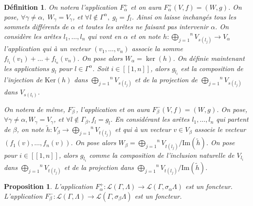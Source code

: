 \documentclass[a4paper,10pt]{article}
\newtheorem{defi}{Définition}[section]
\newtheorem{prop}{Proposition}[section]
\begin{document}
\begin{defi}
	On notera l'application $F_{\alpha}^{+}$ et on aura $F_{\alpha}^{+}(V,f)=(W,g)$. On pose, $\forall \gamma\neq\alpha,\;W_{\gamma}=V_{\gamma}$, et $\forall l \notin \Gamma^{\alpha},\; g_{l}=f_{l}$. Ainsi on laisse inchangés tous les sommets différents de $\alpha$ et toutes les arêtes ne faisant pas intervenir $\alpha$. On considère les arêtes $l_{1},\dots,l_{n}$ qui vont en $\alpha$ et on note $h:\overset{n}{\underset{j=1}{\bigoplus}}V_{s(l_{j})}\rightarrow V_{\alpha}$ l'application qui à un vecteur $(v_{1},\dots,v_{n})$ associe la somme $f_{l_{1}}(v_{1})+\dots+f_{l_{n}}(v_{n})$. On pose alors $W_{\alpha}=\ker(h)$. On définie maintenant les applications $g_{l}$ pour $l\in\Gamma^{\alpha}$. Soit $i\in[\![1,n]\!]$, alors $g_{l_{i}}$ est la composition de l'injection de $\mathrm{Ker}(h)$ dans $\overset{n}{\underset{j=1}{\bigoplus}}V_{s(l_{j})}$ et de la projection de $\overset{n}{\underset{j=1}{\bigoplus}}V_{s(l_{j})}$ dans $V_{s(l_{i})}$. 

	On notera de même, $F^{-}_{\beta}$, l'application et on aura $F^{-}_{\beta}(V,f) = (W,g)$. On pose, $\forall \gamma \neq \alpha, W_\gamma = V_\gamma$, et $\forall l \notin \Gamma_\beta, f_l = g_l$. En considérant les arêtes $l_1, \dots, l_n$ qui partent de $\beta$, on note $\tilde{h} : V_\beta \rightarrow \overset{n}{\underset{j=1}{\bigoplus}}V_{t(l_{j})}$ et qui à un vecteur $v \in V_\beta$ associe le vecteur $(f_1(v),\dots, f_n(v))$. On pose alors $W_\beta = \overset{n}{\underset{j=1}{\bigoplus}}V_{t(l_{j})}/\mathrm{Im}(\tilde{h})$. On pose pour $i\in [\![1,n]\!]$, alors $g_{l_i}$ comme la composition de l'inclusion naturelle de $V_{l_i}$ dans $\overset{n}{\underset{j=1}{\bigoplus}}V_{t(l_{j})}$ et de la projection dans $\overset{n}{\underset{j=1}{\bigoplus}}V_{t(l_{j})}/\mathrm{Im}(\tilde h)$.

\end{defi}

\begin{prop}
	L'application $F_{\alpha}^{+}:\mathscr{L}(\Gamma,\Lambda)\rightarrow\mathscr{L}(\Gamma,\sigma_{\alpha}\Lambda)$ est un foncteur.
	L'application $F_{\beta}^{-}:\mathscr{L}(\Gamma,\Lambda)\rightarrow\mathscr{L}(\Gamma,\sigma_{\beta}\Lambda)$ est un foncteur.
\end{prop}
\end{document}
